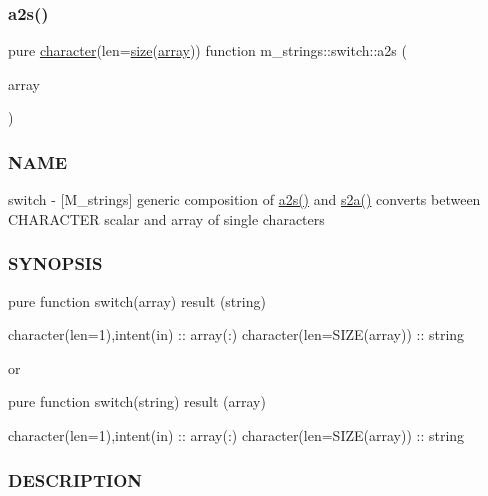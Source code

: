 \subsubsection{\texorpdfstring{a2s()}{a2s()}}
{\footnotesize\ttfamily pure \hyperlink{option__stopwatch_83_8txt_abd4b21fbbd175834027b5224bfe97e66}{character}(len=\hyperlink{what__overview_81_8txt_ab5692ed87074f1d5ec850a9ffa8b5af9}{size}(\hyperlink{intro__blas1_83_8txt_a89db1945e1a335ab0184c6a097821e32}{array})) function m\+\_\+strings\+::switch\+::a2s (\begin{DoxyParamCaption}\item[{\hyperlink{option__stopwatch_83_8txt_abd4b21fbbd175834027b5224bfe97e66}{character}(len=1), dimension(\+:), intent(\hyperlink{M__journal_83_8txt_afce72651d1eed785a2132bee863b2f38}{in})}]{array }\end{DoxyParamCaption})\hspace{0.3cm}{\ttfamily [private]}}



\subsubsection*{N\+A\+ME}

switch -\/ \mbox{[}M\+\_\+strings\mbox{]} generic composition of \hyperlink{interfacem__strings_1_1switch_a9e8d2a8effdbed2a822cfe14bbb9983c}{a2s()} and \hyperlink{interfacem__strings_1_1switch_a60d3e2ead0b3cfd08eaf61f93d3caf57}{s2a()} converts between C\+H\+A\+R\+A\+C\+T\+ER scalar and array of single characters

\subsubsection*{S\+Y\+N\+O\+P\+S\+IS}

\begin{DoxyVerb}pure function switch(array) result (string)

 character(len=1),intent(in) :: array(:)
 character(len=SIZE(array))  :: string

or

pure function switch(string) result (array)

 character(len=1),intent(in) :: array(:)
 character(len=SIZE(array))  :: string
\end{DoxyVerb}


\subsubsection*{D\+E\+S\+C\+R\+I\+P\+T\+I\+ON}

